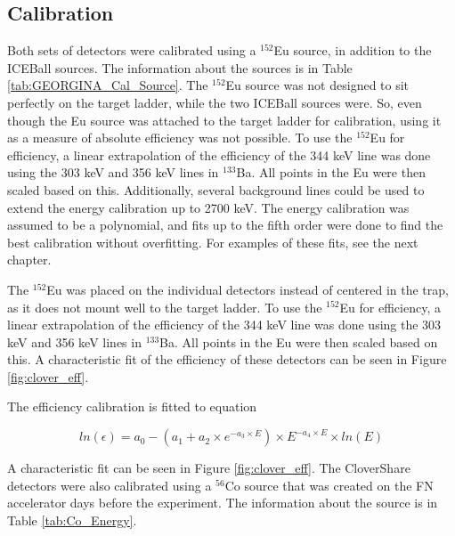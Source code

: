 

\subsection{Calibration}
\label{sec:clover_cal}

Both sets of detectors were calibrated using a $^{152}$Eu source, in addition to the ICEBall sources. The information about the sources is in Table \ref{tab:GEORGINA_Cal_Source}. The $^{152}$Eu source was not designed to sit perfectly on the target ladder, while the two ICEBall sources were. So, even though the Eu source was attached to the target ladder for calibration, using it as a measure of absolute efficiency was not possible. To use the $^{152}$Eu for efficiency, a linear extrapolation of the efficiency of the 344 keV line was done using the 303 keV and 356 keV lines in $^{133}$Ba. All points in the Eu were then scaled based on this. Additionally, several background lines could be used to extend the energy calibration up to 2700 keV. The energy calibration was assumed to be a polynomial, and fits up to the fifth order were done to find the best calibration without overfitting. For examples of these fits, see the next chapter.



The $^{152}$Eu was placed on the individual detectors instead of centered in the trap, as it does not mount well to the target ladder. To use the $^{152}$Eu for efficiency, a linear extrapolation of the efficiency of the 344 keV line was done using the 303 keV and 356 keV lines in $^{133}$Ba. All points in the Eu were then scaled based on this. A characteristic fit of the efficiency of these detectors can be seen in Figure \ref{fig:clover_eff}.

The efficiency calibration is fitted to equation

\begin{equation}
    ln(\epsilon) = a_0-(a_1+a_2\times e^{-a_3\times E})\times E^{-a_4\times E}\times ln(E)
    \label{eq:Ge_Eff}
\end{equation}

A characteristic fit can be seen in Figure \ref{fig:clover_eff}. The CloverShare detectors were also calibrated using a $^{56}$Co source that was created on the FN accelerator days before the experiment. The information about the source is in Table \ref{tab:Co_Energy}. 



